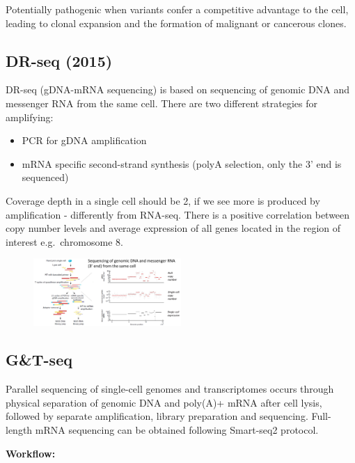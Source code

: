Potentially pathogenic when variants confer a competitive advantage to
the cell, leading to clonal expansion and the formation of malignant or
cancerous clones.

\hypertarget{dr-seq-2015}{%
\subsection{DR-seq (2015)}\label{dr-seq-2015}}

DR-seq (gDNA-mRNA sequencing) is based on sequencing of genomic DNA and
messenger RNA from the same cell. There are two different strategies for
amplifying:

\begin{itemize}
\tightlist
\item
  PCR for gDNA amplification
\item
  mRNA specific second-strand synthesis (polyA selection, only the 3'
  end is sequenced)
\end{itemize}

Coverage depth in a single cell should be 2, if we see more is produced
by amplification - differently from RNA-seq. There is a positive
correlation between copy number levels and average expression of all
genes located in the region of interest e.g.~chromosome 8.

\begin{figure}
\centering
\includegraphics[width=0.5\textwidth]{images/Screenshot_2.png}
\caption{}
\end{figure}

\hypertarget{gt-seq}{%
\subsection{G\&T-seq}\label{gt-seq}}

Parallel sequencing of single-cell genomes and transcriptomes occurs
through physical separation of genomic DNA and poly(A)+ mRNA after cell
lysis, followed by separate amplification, library preparation and
sequencing. Full-length mRNA sequencing can be obtained following
Smart-seq2 protocol.

\textbf{Workflow:}

